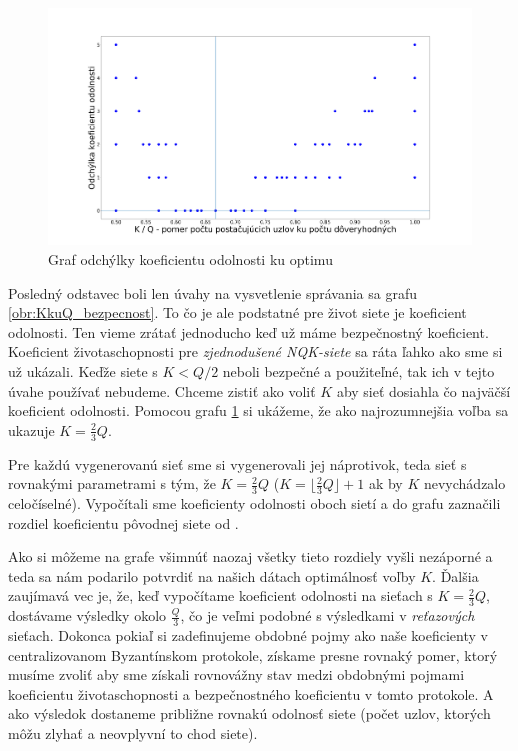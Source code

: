 \begin{figure}
\centerline{\includegraphics[width=1.2\textwidth]{images/KkuQ_odchylka.png}}
\caption{Graf odchýlky koeficientu odolnosti ku optimu} \label{obr:KkuQ_odchylka}
\end{figure}

Posledný odstavec boli len úvahy na vysvetlenie správania sa grafu
\ref{obr:KkuQ_bezpecnost}.
To čo je ale podstatné pre život siete je koeficient odolnosti. Ten vieme zrátať
jednoducho keď už máme bezpečnostný koeficient. Koeficient životaschopnosti
pre \textit{zjednodušené NQK-siete} sa ráta ľahko ako sme si už ukázali.
Keďže siete s $K < Q/2$ neboli bezpečné a použiteľné, tak ich v tejto úvahe
používať nebudeme.
Chceme zistiť ako voliť $K$ aby sieť dosiahla čo najväčší koeficient odolnosti.
Pomocou grafu \ref{obr:KkuQ_odchylka} si ukážeme, že ako najrozumnejšia
voľba sa ukazuje $K=\frac{2}{3}Q$.

Pre každú vygenerovanú sieť sme si vygenerovali jej  náprotivok,
teda sieť s rovnakými parametrami s tým, že $K=\frac{2}{3}Q$
($K=\lfloor\frac{2}{3}Q\rfloor+1$ ak by $K$ nevychádzalo celočíselné).
Vypočítali sme koeficienty odolnosti oboch sietí a do grafu zaznačili rozdiel
koeficientu pôvodnej siete od .

Ako si môžeme na grafe všimnúť naozaj všetky tieto rozdiely vyšli nezáporné
a teda sa nám podarilo potvrdiť na našich dátach optimálnosť voľby $K$.
Ďalšia zaujímavá vec je, že, keď vypočítame koeficient odolnosti na sieťach
s $K=\frac{2}{3}Q$, dostávame výsledky okolo $\frac{Q}{3}$, čo je veľmi
podobné s výsledkami v \textit{reťazových} sieťach.
Dokonca pokiaľ si zadefinujeme obdobné pojmy ako naše koeficienty v
centralizovanom Byzantínskom protokole\cite{li2007beyond}, získame presne
rovnaký pomer, ktorý musíme zvoliť aby sme získali rovnovážny stav medzi
obdobnými pojmami koeficientu životaschopnosti a bezpečnostného koeficientu
v tomto protokole. A ako výsledok dostaneme približne rovnakú odolnosť siete
(počet uzlov, ktorých môžu zlyhať a neovplyvní to chod siete).

